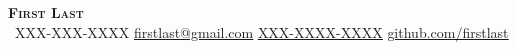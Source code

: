 \begin{center}
    \textbf{\Huge \scshape First Last} \\ \vspace{1pt}
     \ \small XXX-XXX-XXXX \quad
    \href{mailto:firstlast@gmail.com}{ \underline{firstlast@gmail.com}} \quad
    \href{https://www.linkedin.com/in//}{ \underline{XXX-XXXX-XXXX}} \quad
    \href{https://github.com/}{ \underline{github.com/firstlast}}
\end{center}